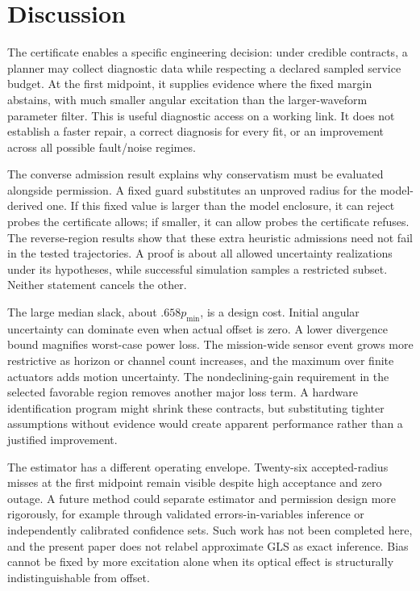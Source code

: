 \section{Discussion}
The certificate enables a specific engineering decision: under credible contracts, a planner may collect diagnostic data while respecting a declared sampled service budget. At the first midpoint, it supplies evidence where the fixed margin abstains, with much smaller angular excitation than the larger-waveform parameter filter. This is useful diagnostic access on a working link. It does not establish a faster repair, a correct diagnosis for every fit, or an improvement across all possible fault/noise regimes.

The converse admission result explains why conservatism must be evaluated alongside permission. A fixed guard substitutes an unproved radius for the model-derived one. If this fixed value is larger than the model enclosure, it can reject probes the certificate allows; if smaller, it can allow probes the certificate refuses. The reverse-region results show that these extra heuristic admissions need not fail in the tested trajectories. A proof is about all allowed uncertainty realizations under its hypotheses, while successful simulation samples a restricted subset. Neither statement cancels the other.

The large median slack, about $.658p_{\min}$, is a design cost. Initial angular uncertainty can dominate even when actual offset is zero. A lower divergence bound magnifies worst-case power loss. The mission-wide sensor event grows more restrictive as horizon or channel count increases, and the maximum over finite actuators adds motion uncertainty. The nondeclining-gain requirement in the selected favorable region removes another major loss term. A hardware identification program might shrink these contracts, but substituting tighter assumptions without evidence would create apparent performance rather than a justified improvement.

The estimator has a different operating envelope. Twenty-six accepted-radius misses at the first midpoint remain visible despite high acceptance and zero outage. A future method could separate estimator and permission design more rigorously, for example through validated errors-in-variables inference or independently calibrated confidence sets. Such work has not been completed here, and the present paper does not relabel approximate GLS as exact inference. Bias cannot be fixed by more excitation alone when its optical effect is structurally indistinguishable from offset.

